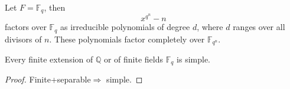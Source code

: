 \documentclass[openany]{book}
\newcommand{\Z}{\mathbb{Z}}
\newcommand{\F}{\mathbb{F}}
\newcommand{\Q}{\mathbb{Q}}
\begin{document}
\begin{cor}
    Let $F=\F_q$, then 
    \begin{equation*}
        x^{q^n}-n
    \end{equation*}
    factors over $\F_q$ as irreducible polynomials of degree $d$, where $d$ ranges over all divisors of $n$. These polynomials factor completely over $\F_{q^n}$.
\end{cor}

\begin{prop}
    Every finite extension of $\Q$ or of finite fields $\F_q$ is simple.
\end{prop}
\begin{proof}
    Finite+separable$\Rightarrow$ simple.
\end{proof}












\end{document}
